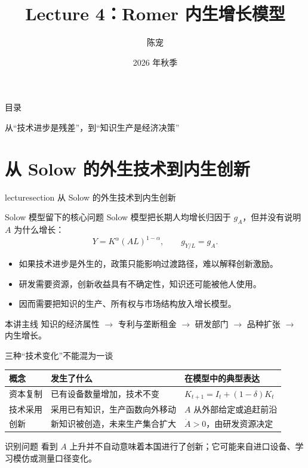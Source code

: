 \documentclass[aspectratio=32]{beamer}
\title[Lecture 4: Romer Model]{Lecture 4：Romer 内生增长模型}
\author{陈宠\inst{1}}
\institute{中国人民大学经济学院\inst{1}}
\date{2026 年秋季}
\newcommand{\lecturesectionpage}[1]{%
\begin{frame}[plain]
\begin{center}
\vfill
\begin{beamercolorbox}[wd=0.74\textwidth,rounded=true,shadow=true,center,sep=1em]{lecturesection}
\LARGE #1
\end{beamercolorbox}
\vfill
\end{center}
\end{frame}
}
\begin{document}
\begin{frame}
\maketitle
\end{frame}

\begin{frame}{目录}
\tableofcontents[hideallsubsections]
\vspace{0.25cm}
\begin{center}
\textcolor{LectureBlue}{从“技术进步是残差”，到“知识生产是经济决策”}
\end{center}
\end{frame}

\section{从 Solow 的外生技术到内生创新}
\lecturesectionpage{从 Solow 的外生技术到内生创新}

\begin{frame}{Solow 模型留下的核心问题}
\small
Solow 模型把长期人均增长归因于 $g_A$，但并没有说明 $A$ 为什么增长：
\[
  Y=K^\alpha(AL)^{1-\alpha},\qquad
  g_{Y/L}=g_A.
\]
\begin{itemize}
  \item 如果技术进步是外生的，政策只能影响过渡路径，难以解释创新激励。
  \item 研发需要资源，创新收益具有不确定性，知识还可能被他人使用。
  \item 因而需要把\alert{知识的生产、所有权与市场结构}放入增长模型。
\end{itemize}
\begin{block}{本讲主线}
知识的经济属性 $\longrightarrow$ 专利与垄断租金 $\longrightarrow$ 研发部门 $\longrightarrow$ 品种扩张 $\longrightarrow$ 内生增长。
\end{block}
\end{frame}

\begin{frame}{三种“技术变化”不能混为一谈}
\small
\begin{table}
\centering
\begin{tabular}{p{}p{}p{}}
\toprule
概念 & 发生了什么 & 在模型中的典型表达 \\
\midrule
资本复制 & 已有设备数量增加，技术不变 & $K_{t+1}=I_t+(1-\delta)K_t$ \\
技术采用 & 采用已有知识，生产函数向外移动 & $A$ 从外部给定或追赶前沿 \\
创新 & 新知识被创造，未来生产集合扩大 & $\dot A>0$，由研发资源决定 \\
\bottomrule
\end{tabular}
\end{table}
\vspace{0.2cm}
\begin{alertblock}{识别问题}
看到 $A$ 上升并不自动意味着本国进行了创新；它可能来自进口设备、学习模仿或测量口径变化。
\end{alertblock}
\end{frame}
\end{document}
